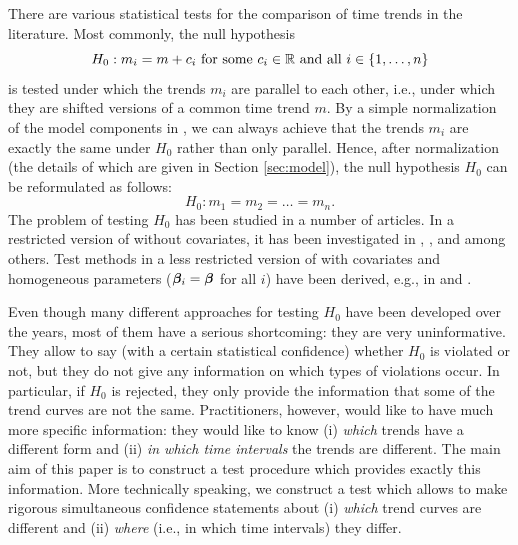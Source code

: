 \documentclass[12pt]{article}
\makeatletter
\renewcommand{\eqref}[1]{\tagform@{\ref{#1}}}
\makeatother
\begin{document}
There are various statistical tests for the comparison of time trends in the literature. Most commonly, the null hypothesis
\[ H_0: m_i = m + c_i \text{ for some } c_i \in \mathbb{R} \text{ and all } i \in \{1,\ldots,n\} \]
is tested under which the trends $m_i$ are parallel to each other, i.e., under which they are shifted versions of a common time trend $m$. By a simple normalization of the model components in \eqref{eq:model_full}, we can always achieve that the trends $m_i$ are exactly the same under $H_0$ rather than only parallel. Hence, after normalization (the details of which are given in Section \ref{sec:model}), the null hypothesis $H_0$ can be reformulated as follows: 
\[ H_0: m_1 = m_2 = \ldots = m_n. \]   
The problem of testing $H_0$ has been studied in a number of articles. In a restricted version of \eqref{eq:model_full} without covariates, it has been investigated in \cite{HaerdleMarron1990}, \cite{Hall1990}, \cite{DegrasWu2012} and \cite{ChenWu2018} among others. Test methods in a less restricted version of \eqref{eq:model_full} with covariates and homogeneous parameters ($\bm{\beta}_i = \bm{\beta}$ for all $i$) have been derived, e.g., in \cite{Zhang2012} and \cite{Hidalgo2014}.


Even though many different approaches for testing $H_0$ have been developed over the years, most of them have a serious shortcoming: they are very uninformative. They allow to say (with a certain statistical confidence) whether $H_0$ is violated or not, but they do not give any information on which types of violations occur. In particular, if $H_0$ is rejected, they only provide the information that some of the trend curves are not the same. Practitioners, however, would like to have much more specific information: they would like to know (i) \textit{which} trends have a different form and (ii) \textit{in which time intervals} the trends are different. The main aim of this paper is to construct a test procedure which provides exactly this information. More technically speaking, we construct a test which allows to make rigorous simultaneous confidence statements about (i) \textit{which} trend curves are different and (ii) \textit{where} (i.e., in which time intervals) they differ. 
\end{document}
